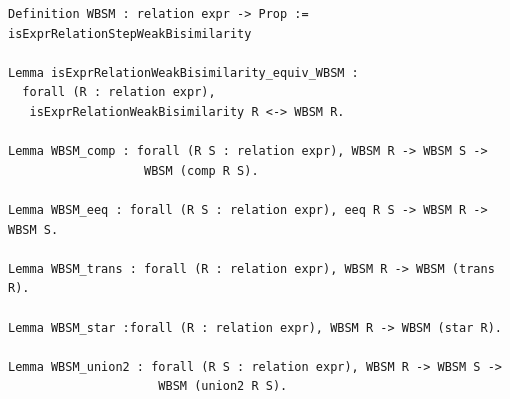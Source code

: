 \documentclass[12pt,twoside,notitlepage]{report}
\theoremstyle{plain}%
\theoremstyle{definition}
\theoremstyle{remark}
\begin{document}
\begin{minipage}{\linewidth}
\begin{lstlisting}[language={Coq}, caption={Weak bisimilarity properties},numbersep=11pt]
Definition WBSM : relation expr -> Prop := isExprRelationStepWeakBisimilarity

Lemma isExprRelationWeakBisimilarity_equiv_WBSM : 
  forall (R : relation expr), 
   isExprRelationWeakBisimilarity R <-> WBSM R.

Lemma WBSM_comp : forall (R S : relation expr), WBSM R -> WBSM S -> 
                   WBSM (comp R S).

Lemma WBSM_eeq : forall (R S : relation expr), eeq R S -> WBSM R -> WBSM S.

Lemma WBSM_trans : forall (R : relation expr), WBSM R -> WBSM (trans R).

Lemma WBSM_star :forall (R : relation expr), WBSM R -> WBSM (star R).

Lemma WBSM_union2 : forall (R S : relation expr), WBSM R -> WBSM S -> 
                     WBSM (union2 R S).
\end{lstlisting}
\end{minipage}
\end{document}
